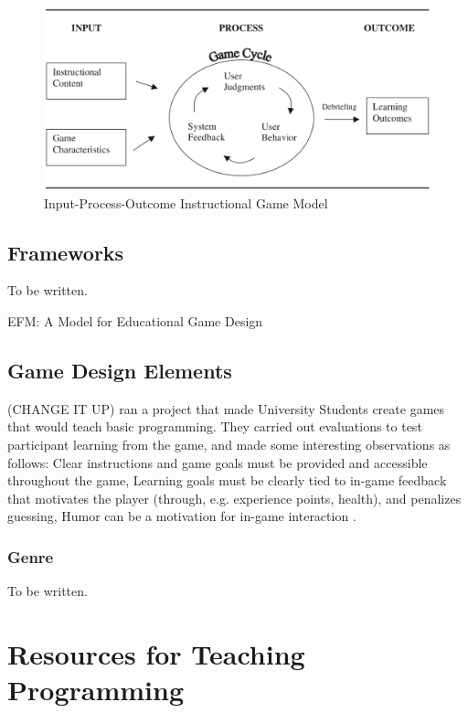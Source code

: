 \documentclass[a4paper,11.5pt]{report}
\numberwithin{figure}{section}
\numberwithin{table}{section}
\numberwithin{equation}{section}
\numberwithin{equation}{section}
\begin{document}
\begin{figure}[H]
 \centering
    \includegraphics[width=1\textwidth]{Inputprocessoutcomegamemodel}
       \captionsetup{justification=centering}
\caption{Input-Process-Outcome Instructional Game Model  {\cite{Driskell2002}}}
\label{fig:Input_process_outcome_game_model}
\end{figure}

\subsection{Frameworks}

To be written.

EFM: A Model for Educational Game Design

\subsection{Game Design Elements}

(CHANGE IT UP) \citeauthor{Barnes2007} ran a project that made University Students create games that would teach basic programming. They carried out evaluations to test participant learning from the game, and made some interesting observations as follows: Clear instructions and game goals must be provided and accessible throughout the game, Learning goals must be clearly tied to in-game feedback that motivates the player (through, e.g. experience points, health), and penalizes guessing, Humor can be a motivation for in-game interaction \cite{Barnes2007}.

\subsubsection{Genre}

To be written.

\section{Resources for Teaching Programming}
\end{document}
